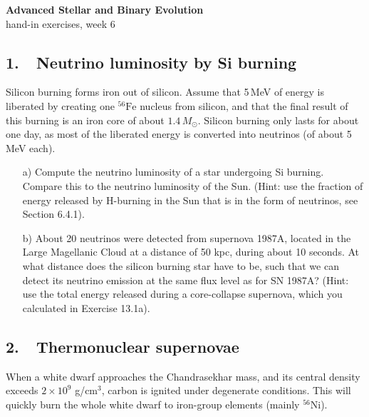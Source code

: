 \documentclass[a4paper,11pt]{article}
\newcommand{\Msun}{\ensuremath{{M}_\odot}}
\newcommand{\Fe}[1]{\ensuremath{{^{#1}\mathrm{Fe}}}}
\begin{document}
\begin{center}
{\Large\bf Advanced Stellar and Binary Evolution} \\ [1ex]
{\large hand-in exercises, week 6}

\end{center}

\subsection*{1.~~Neutrino luminosity by Si burning}
\label{ex:Si-burning}
  
Silicon burning forms iron out of silicon. Assume that 5\,MeV of energy
is liberated by creating one \Fe{56} nucleus from silicon, and that
the final result of this burning is an iron core of about
$1.4\,\Msun$. Silicon burning only lasts for about one day, as most of the
liberated energy is converted into neutrinos (of about 5\,MeV each).

\begin{enumerate}

\item[a)] Compute the neutrino luminosity of a star undergoing Si burning.
Compare this to the neutrino luminosity of the Sun. (Hint: use the fraction of energy released by H-burning in the Sun that is in the form of neutrinos, see Section 6.4.1).

\item[b)] About 20 neutrinos were detected from supernova 1987A, located in the Large Magellanic Cloud at a distance of 50 kpc, during about 10 seconds. At what distance does the silicon burning star have to be, such that we can detect its neutrino emission at the same flux level as for SN 1987A? (Hint: use the total energy released during a core-collapse supernova, which you calculated in Exercise 13.1a).

\end{enumerate} 

\subsection*{2.~~Thermonuclear supernovae} 
\label{ex:C-ignition-wd}

When a white dwarf approaches the Chandrasekhar mass, and its central
density exceeds $2\times10^9$ g/cm$^3$, carbon is ignited under
degenerate conditions. This will quickly burn the whole white dwarf to
iron-group elements (mainly $^{56}$Ni).  
\end{document}

